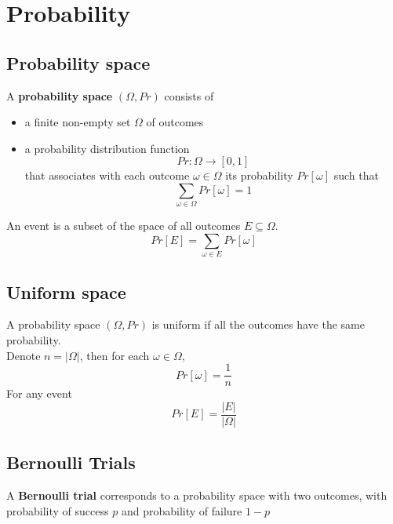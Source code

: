 \chapter{Probability}

\section{Probability space}

\begin{framed}
   A \textbf{probability space } $(\Omega, Pr)$ consists of
    \begin{itemize}
       \item a finite non-empty set  $\Omega$ of outcomes
       \item a probability distribution function
          \[
             Pr: \Omega \rightarrow [0, 1]
          \] 
          that associates with each outcome $\omega \in \Omega$ its probability  $Pr[\omega]$ such that 
           \[
              \sum_{\omega \in \Omega} Pr[\omega] = 1
          \] 
   \end{itemize}

   An event is a subset of the space of all outcomes  $E \subseteq \Omega$. 
    \[
       Pr[E] = \sum_{\omega \in E} Pr[\omega]
   \] 
\end{framed}


\section{Uniform space}
\begin{framed}
   A probability space $(\Omega, Pr)$ is uniform if all the outcomes have the same probability. \\

    Denote $n = |\Omega|$, then for each  $\omega \in \Omega$,
    \[
       Pr[\omega] = \frac{1}{n}
    \] 
    For any event
    \[
       Pr[E] = \frac{|E|}{|\Omega|}
    \] 
  
\end{framed}

\section{Bernoulli Trials}
\begin{framed}
   A \textbf{Bernoulli trial} corresponds to a probability space with two outcomes, with probability of success $p$ and probability of failure $1 - p$
\end{framed}

